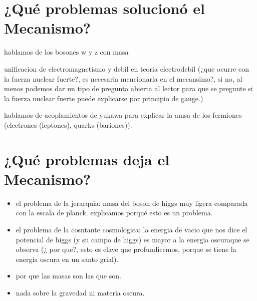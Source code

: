 \section{¿Qué problemas solucionó el Mecanismo?}

hablamos de los bosones w y z con masa

unificacion de electromagnetismo y debil en teoria electrodebil (¿que ocurre con la fuerza nuclear fuerte?, es necesaria mencionarla en el mecansimo?, si no, al menos podemos dar un tipo de pregunta abierta al lector para que se pregunte si la fuerza nuclear fuerte puede explicarse por principio de gauge.)

hablamos de acoplamientos de yukawa para explicar la amsa de los fermiones (electrones (leptones), quarks (bariones)).


\section{¿Qué problemas deja el Mecanismo?}

\begin{itemize}
	\item el problema de la jerarquia: masa del boson de higgs muy ligera comparada con la escala de planck. explicamos porqué esto es un problema.

	\item el problema de la cosntante cosmologica: la energia de vacio que nos dice el potencial de higgs (y su campo de higgs) es mayor a la energia oscuraque se observa (¿ por que?, esto es clave que profundicemos, porque se tiene la energia oscura en un santo grial).

	\item por que las masas son las que son.

	\item nada sobre la gravedad ni materia oscura.

\end{itemize}




